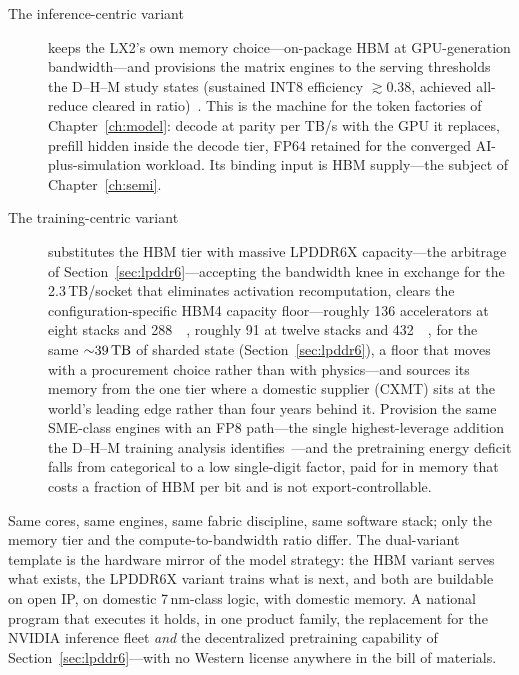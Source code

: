\begin{description}
  \item[The inference-centric variant] keeps the LX2's own memory choice---on-package HBM at GPU-generation bandwidth---and provisions the matrix engines to the serving thresholds the D--H--M study states (sustained INT8 efficiency $\gtrsim$0.38, achieved all-reduce cleared in ratio)~\cite{dhm-long}. This is the machine for the token factories of Chapter~\ref{ch:model}: decode at parity per TB/s with the GPU it replaces, prefill hidden inside the decode tier, FP64 retained for the converged AI-plus-simulation workload. Its binding input is HBM supply---the subject of Chapter~\ref{ch:semi}.
  \item[The training-centric variant] substitutes the HBM tier with massive LPDDR6X capacity---the arbitrage of Section~\ref{sec:lpddr6}---accepting the bandwidth knee in exchange for the 2.3\,TB/socket that eliminates activation recomputation, clears the configuration-specific HBM4 capacity floor---roughly 136 accelerators at eight stacks and \SI{288}{\giga\byte}, roughly 91 at twelve stacks and \SI{432}{\giga\byte}, for the same ${\sim}\SI{39}{\tera\byte}$ of sharded state (Section~\ref{sec:lpddr6}), a floor that moves with a procurement choice rather than with physics---and sources its memory from the one tier where a domestic supplier (CXMT) sits at the world's leading edge rather than four years behind it. Provision the same SME-class engines with an FP8 path---the single highest-leverage addition the D--H--M training analysis identifies~\cite{dhm-long}---and the pretraining energy deficit falls from categorical to a low single-digit factor, paid for in memory that costs a fraction of HBM per bit and is not export-controllable.
\end{description}

Same cores, same engines, same fabric discipline, same software stack; only the memory tier and the compute-to-bandwidth ratio differ. The dual-variant template is the hardware mirror of the model strategy: the HBM variant serves what exists, the LPDDR6X variant trains what is next, and both are buildable on open IP, on domestic 7\,nm-class logic, with domestic memory. A national program that executes it holds, in one product family, the replacement for the NVIDIA inference fleet \emph{and} the decentralized pretraining capability of Section~\ref{sec:lpddr6}---with no Western license anywhere in the bill of materials.

